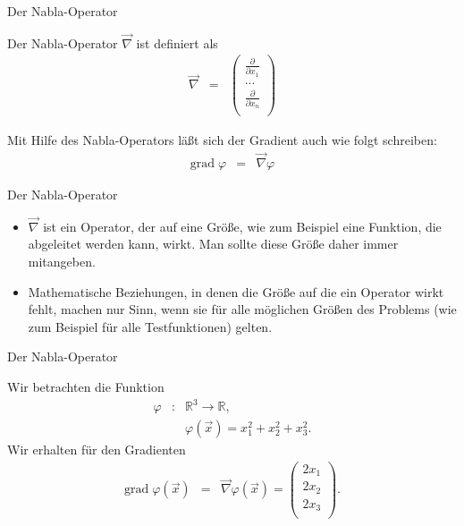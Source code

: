 \documentclass[german]{beamer}
\newcommand{\bq}{\begin{eqnarray*}}
\newcommand{\eq}{\end{eqnarray*}}
\begin{document}
\begin{frame}{Der Nabla-Operator}

\begin{definition}
Der Nabla-Operator $\vec{\nabla}$ ist definiert als
\bq
 \vec{\nabla} & = & \left( \begin{array}{c}
                           \frac{\partial}{\partial x_1} \\
                           ... \\
                           \frac{\partial}{\partial x_n} \\
                           \end{array}
                    \right)
\eq
\end{definition}
Mit Hilfe des Nabla-Operators l\"a{\ss}t sich der Gradient auch wie folgt schreiben:
\bq
 \mbox{grad} \; \varphi & = & \vec{\nabla} \varphi
\eq

\end{frame}

\begin{frame}{Der Nabla-Operator}

\begin{itemize}
\item $\vec{\nabla}$ ist ein \alert{Operator}, der auf eine Gr\"o{\ss}e, wie zum Beispiel eine 
Funktion, die abgeleitet werden kann, wirkt.
Man sollte diese Gr\"o{\ss}e daher immer mitangeben. 

\item Mathematische Beziehungen, in denen die
Gr\"o{\ss}e auf die ein Operator wirkt fehlt, machen nur Sinn, wenn sie f\"ur alle
m\"oglichen Gr\"o{\ss}en des Problems (wie zum Beispiel f\"ur alle Testfunktionen) gelten.
\end{itemize}

\end{frame}

\begin{frame}{Der Nabla-Operator}

\begin{example}
Wir betrachten die Funktion
\bq
 \varphi & : & {\mathbb R}^3 \rightarrow {\mathbb R},
 \nonumber \\
 & & \varphi\left(\vec{x}\right) = x_1^2 + x_2^2 + x_3^2.
\eq
Wir erhalten f\"ur den Gradienten
\bq
 \mbox{grad}\; \varphi\left(\vec{x}\right)
 & = & \vec{\nabla} \varphi\left(\vec{x}\right)
 =
 \left( \begin{array}{c}
  2 x_1 \\ 2 x_2 \\ 2 x_3 \\
 \end{array} \right).
\eq
\end{example}

\end{frame}
\end{document}
